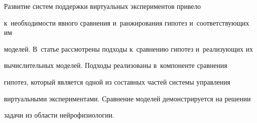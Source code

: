  

      \vspace*{-4pt}



Развитие систем поддержки виртуальных экспериментов привело 

к~необходимости явного сравнения и~ранжирования гипотез и~соответствующих им 

моделей. В~статье рассмотрены подходы к~сравнению гипотез и~реализующих их 

вы\-чис\-ли\-тель\-ных моделей. Подходы реализованы в~компоненте сравнения 

гипотез, который является одной из составных частей системы управления 

виртуальными экспериментами. Сравнение моделей демонстрируется на решении 

задачи из области нейрофизиологии. 





